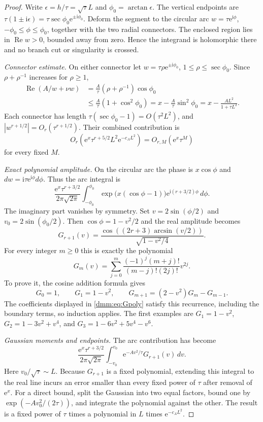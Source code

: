 \documentclass[11pt,letterpaper]{article}
\numberwithin{equation}{section}
\theoremstyle{definition}\newtheorem{definition}[theorem]{Definition}
\theoremstyle{remark}\newtheorem{remark}[theorem]{Remark}
\newcommand{\ii}{\mathrm i}
\newcommand{\ee}{\mathrm e}
\DeclareMathOperator{\Rea}{Re}
\begin{document}
\begin{proof}
Write $\epsilon=h/\tau=\sqrt\tau L$ and $\phi_0=\arctan\epsilon$. The vertical endpoints are
$\tau(1\pm\ii\epsilon)=\tau\sec\phi_0\ee^{\pm\ii\phi_0}$.
Deform the segment to the circular arc $w=\tau\ee^{\ii\phi}$,
$-\phi_0\le\phi\le\phi_0$, together with the two radial connectors. The enclosed region lies in $\Rea w>0$, bounded away from zero. Hence the integrand is holomorphic there and no branch cut or singularity is crossed.

\emph{Connector estimate.}
On either connector let $w=\tau\rho\ee^{\pm\ii\phi_0}$,
$1\le\rho\le\sec\phi_0$. Since $\rho+\rho^{-1}$ increases for $\rho\ge1$,
\begin{align}\label{dmm:eq:connector}
\Rea(A/w+\nu w)
&=\frac A\tau(\rho+\rho^{-1})\cos\phi_0\nonumber\\
&\le\frac A\tau(1+\cos^2\phi_0)
=x-\frac A\tau\sin^2\phi_0
=x-\frac{AL^2}{1+\tau L^2}.
\end{align}
Each connector has length $\tau(\sec\phi_0-1)=O(\tau^2L^2)$, and
$|w^{r+1/2}|=O_r(\tau^{r+1/2})$. Their combined contribution is
\begin{equation}\label{dmm:eq:connectorerror}
O_r\!\left(\ee^x\tau^{r+5/2}L^2\ee^{-c_AL^2}\right)
=O_{r,M}(\ee^x\tau^M)
\end{equation}
for every fixed $M$.

\emph{Exact polynomial amplitude.}
On the circular arc the phase is $x\cos\phi$ and $dw=\ii\tau\ee^{\ii\phi}d\phi$. Thus the arc integral is
\[
\frac{\ee^x\tau^{r+3/2}}{2\pi\sqrt{2\pi}}
\int_{-\phi_0}^{\phi_0}\exp\bigl(x(\cos\phi-1)\bigr)
\ee^{\ii(r+3/2)\phi}\,d\phi.
\]
The imaginary part vanishes by symmetry. Set $v=2\sin(\phi/2)$ and
$v_0=2\sin(\phi_0/2)$. Then $\cos\phi=1-v^2/2$ and the real amplitude becomes
\[
G_{r+1}(v)=\frac{\cos((2r+3)\arcsin(v/2))}{\sqrt{1-v^2/4}}.
\]
For every integer $m\ge0$ this is exactly the polynomial
\begin{equation}\label{dmm:eq:Gpoly}
G_m(v)=\sum_{j=0}^{m}
\frac{(-1)^j(m+j)!}{(m-j)!(2j)!}v^{2j}.
\end{equation}
To prove it, the cosine addition formula gives
\[
G_0=1,\qquad G_1=1-v^2,\qquad
G_{m+1}=(2-v^2)G_m-G_{m-1}.
\]
The coefficients displayed in \eqref{dmm:eq:Gpoly} satisfy this recurrence, including the boundary terms, so induction applies. The first examples are
$G_1=1-v^2$, $G_2=1-3v^2+v^4$, and
$G_3=1-6v^2+5v^4-v^6$.

\emph{Gaussian moments and endpoints.}
The arc contribution has become
\begin{equation}\label{dmm:eq:Gaussianintegral}
\frac{\ee^x\tau^{r+3/2}}{2\pi\sqrt{2\pi}}
\int_{-v_0}^{v_0}\ee^{-Av^2/\tau}G_{r+1}(v)\,dv.
\end{equation}
Here $v_0/\sqrt\tau\sim L$. Because $G_{r+1}$ is a fixed polynomial, extending this integral to the real line incurs an error smaller than every fixed power of $\tau$ after removal of $\ee^x$. For a direct bound, split the Gaussian into two equal factors, bound one by $\exp(-Av_0^2/(2\tau))$, and integrate the polynomial against the other. The result is a fixed power of $\tau$ times a polynomial in $L$ times $\ee^{-c_AL^2}$.


\end{proof}
\end{document}
